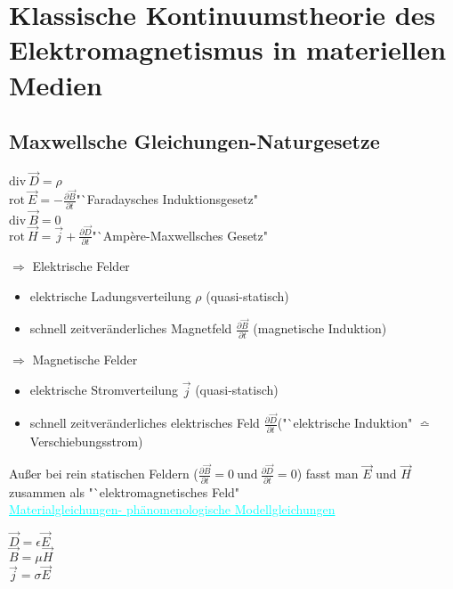 \documentclass[]{article}
\begin{document}
\section{Klassische Kontinuumstheorie des Elektromagnetismus in materiellen Medien}
\subsection{Maxwellsche Gleichungen-Naturgesetze}
	\begin{center}
		\begin{boxedminipage}[cyan]{8cm}
			$\text{div} \ \vec{D}= \rho$\qquad 
			\\$\text{rot}\ \vec{E}=-\frac{\partial \vec{B}}{\partial t}$\qquad "`Faradaysches Induktionsgesetz"
			\\$\text{div} \ \vec{B}=0$
			\\$\text{rot} \ \vec{H}= \vec{j}+ \frac{\partial \vec{D}}{\partial t}$\qquad "`Ampère-Maxwellsches Gesetz"
		\end{boxedminipage}
	\end{center}
$\Rightarrow$ Elektrische Felder
	\begin{itemize} 
		\item elektrische Ladungsverteilung $\rho$ (quasi-statisch) 
		\item schnell zeitveränderliches Magnetfeld $\frac{\partial \vec{B}}{\partial t}$ (magnetische Induktion)
	\end{itemize}

\newpage

	$\Rightarrow$ Magnetische Felder
	\begin{itemize}
		\item 
			elektrische Stromverteilung $\vec{j}$ (quasi-statisch)
		\item 
			schnell zeitveränderliches elektrisches Feld  $\frac{\partial \vec{D}}{\partial t} $("`elektrische Induktion" $\bumpeq$ Verschiebungsstrom)
	\end{itemize}
	
	Außer bei rein statischen Feldern ($\frac{\partial \vec{B}}{\partial t}=0 \ \text{und} \ \frac{\partial \vec{D}}{\partial t}=0$) fasst man $\vec{E}$ und $\vec{H}$ zusammen als "`elektromagnetisches Feld" 
	\\\textcolor{cyan}{\underline{Materialgleichungen- phänomenologische Modellgleichungen}}
	
	\begin{center}
		\begin{boxedminipage}[cyan]{3cm}
			\begin{center}
				$\vec{D}= \epsilon \vec{E}$\\
				$\vec{B}=\mu \vec{H}$\\
				$\vec{j}= \sigma \vec{E}$
			\end{center}
		\end{boxedminipage}
	\end{center}
\end{document}
